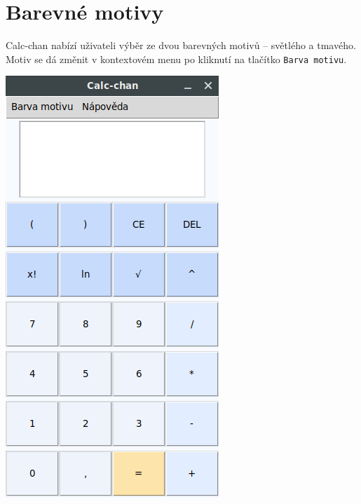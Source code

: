 \documentclass[a4paper, 11pt]{article}
\begin{document}
\section{Barevné motivy}
Calc-chan nabízí uživateli výběr ze dvou barevných motivů -- světlého a tmavého. Motiv se dá změnit v kontextovém menu po kliknutí na tlačítko \texttt{Barva motivu}.\\
\begin{center}
\includegraphics[scale=0.5]{screenshot.png}
\hspace{50pt}

\end{center}
\end{document}
